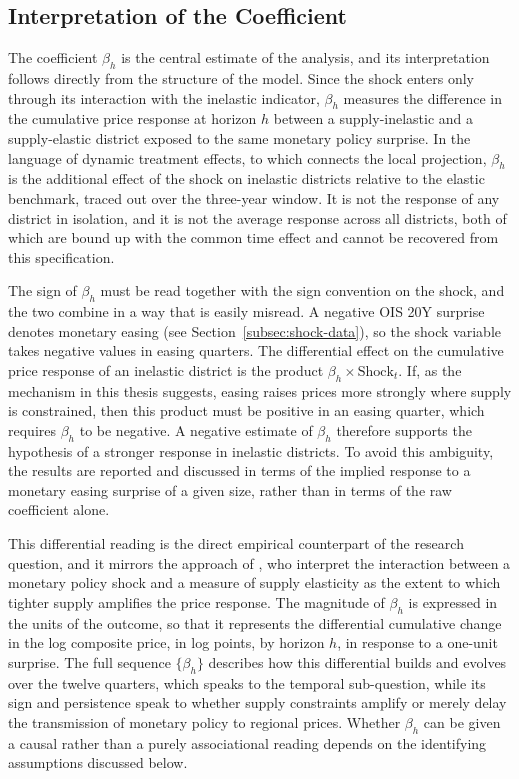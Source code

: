 \documentclass[a4paper,12pt, headsepline]{scrartcl}
\numberwithin{equation}{section}
\begin{document}
\subsection{Interpretation of the Coefficient}\label{subsec:coef-interpretation}
The coefficient $\beta_h$ is the central estimate of the analysis, and its interpretation follows directly from the structure of the model. Since the shock enters only through its interaction with the inelastic indicator, $\beta_h$ measures the difference in the cumulative price response at horizon $h$ between a supply-inelastic and a supply-elastic district exposed to the same monetary policy surprise. In the language of dynamic treatment effects, to which \citet{jorda2023} connects the local projection, $\beta_h$ is the additional effect of the shock on inelastic districts relative to the elastic benchmark, traced out over the three-year window. It is not the response of any district in isolation, and it is not the average response across all districts, both of which are bound up with the common time effect and cannot be recovered from this specification.

The sign of $\beta_h$ must be read together with the sign convention on the shock, and the two combine in a way that is easily misread. A negative OIS 20Y surprise denotes monetary easing (see Section~\ref{subsec:shock-data}), so the shock variable takes negative values in easing quarters. The differential effect on the cumulative price response of an inelastic district is the product $\beta_h \times \text{Shock}_t$. If, as the mechanism in this thesis suggests, easing raises prices more strongly where supply is constrained, then this product must be positive in an easing quarter, which requires $\beta_h$ to be negative. A negative estimate of $\beta_h$ therefore supports the hypothesis of a stronger response in inelastic districts. To avoid this ambiguity, the results are reported and discussed in terms of the implied response to a monetary easing surprise of a given size, rather than in terms of the raw coefficient alone.

This differential reading is the direct empirical counterpart of the research question, and it mirrors the approach of \citet{aastveit2022}, who interpret the interaction between a monetary policy shock and a measure of supply elasticity as the extent to which tighter supply amplifies the price response. The magnitude of $\beta_h$ is expressed in the units of the outcome, so that it represents the differential cumulative change in the log composite price, in log points, by horizon $h$, in response to a one-unit surprise. The full sequence $\{\beta_h\}$ describes how this differential builds and evolves over the twelve quarters, which speaks to the temporal sub-question, while its sign and persistence speak to whether supply constraints amplify or merely delay the transmission of monetary policy to regional prices. Whether $\beta_h$ can be given a causal rather than a purely associational reading depends on the identifying assumptions discussed below.
\end{document}
